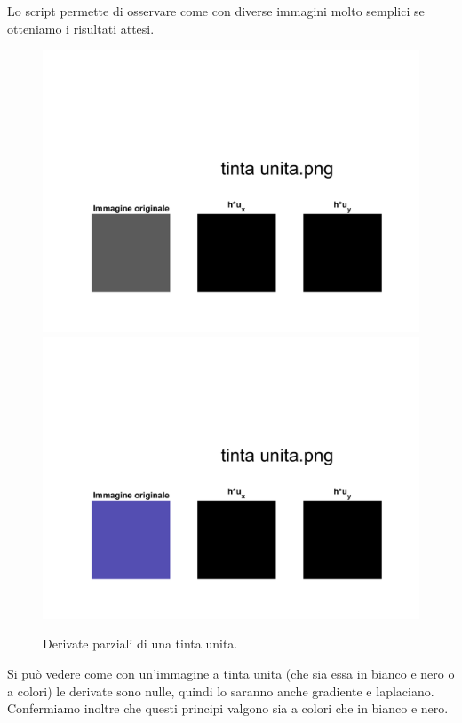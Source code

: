 \vspace{1em}
Lo script permette di osservare come con diverse immagini molto semplici se otteniamo i risultati attesi.\\
\newpage
\begin{figure}[htb] 
\centering
\includegraphics[scale=0.4, trim = 0 0 0 10.5cm, clip]{Pictures/Risultati/tinta unita bianco e nero derivate parziali.png}
\includegraphics[scale=0.4, trim = 0 0 0 10.5cm, clip]{Pictures/Risultati/tinta unita derivate parziali.png}
\caption{Derivate parziali di una tinta unita.}\label{fig:figura}
\end{figure}

Si può vedere come con un'immagine a tinta unita (che sia essa in bianco e nero o a colori) le derivate sono nulle, quindi lo saranno anche gradiente e laplaciano. Confermiamo inoltre che questi principi valgono sia a colori che in bianco e nero.\\

